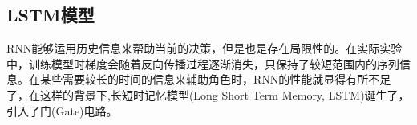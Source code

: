 \documentclass[a4paper,AutoFakeBold,oneside,12pt]{book}
\begin{document}
%
%
%
%
%
%
%
%
%
%
%


\subsection{LSTM模型}
RNN能够运用历史信息来帮助当前的决策，但是也是存在局限性的。在实际实验中，训练模型时梯度会随着反向传播过程逐渐消失，只保持了较短范围内的序列信息。在某些需要较长的时间的信息来辅助角色时，RNN的性能就显得有所不足了，在这样的背景下,长短时记忆模型(Long Short Term Memory, LSTM)诞生了，引入了门(Gate)电路。
\end{document}
